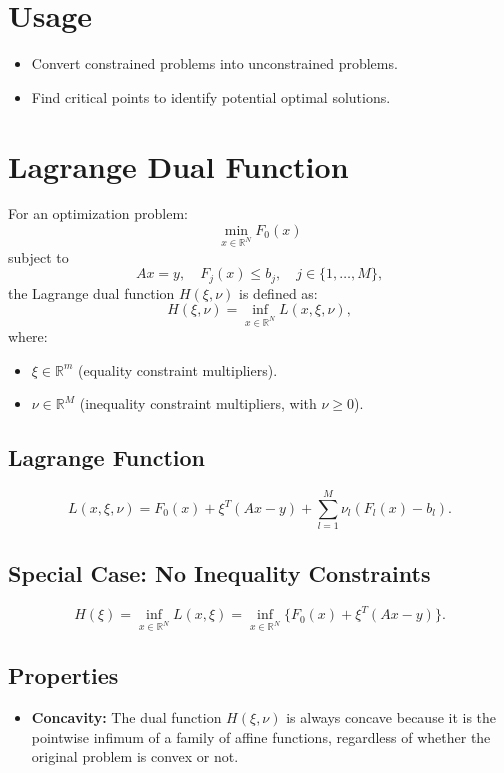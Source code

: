 \documentclass{article}
\begin{document}
\section*{Usage}
\begin{itemize}
    \item Convert constrained problems into unconstrained problems.
    \item Find critical points to identify potential optimal solutions.
\end{itemize}





\usepackage{amsthm}





\section*{Lagrange Dual Function}

For an optimization problem:
\[
\min_{x \in \mathbb{R}^N} F_0(x)
\]
subject to 
\[
Ax = y, \quad F_j(x) \leq b_j, \quad j \in \{1, \ldots, M\},
\]
the Lagrange dual function \(H(\xi, \nu)\) is defined as:
\[
H(\xi, \nu) = \inf_{x \in \mathbb{R}^N} L(x, \xi, \nu),
\]
where:
\begin{itemize}
    \item \(\xi \in \mathbb{R}^m\) (equality constraint multipliers).
    \item \(\nu \in \mathbb{R}^M\) (inequality constraint multipliers, with \(\nu \geq 0\)).
\end{itemize}

\subsection*{Lagrange Function}
\[
L(x, \xi, \nu) = F_0(x) + \xi^T(Ax - y) + \sum_{l=1}^{M} \nu_l (F_l(x) - b_l).
\]

\subsection*{Special Case: No Inequality Constraints}
\[
H(\xi) = \inf_{x \in \mathbb{R}^N} L(x, \xi) = \inf_{x \in \mathbb{R}^N} \{ F_0(x) + \xi^T(Ax - y) \} .
\]

\subsection*{Properties}
\begin{itemize}
    \item \textbf{Concavity:} The dual function \(H(\xi, \nu)\) is always concave because it is the pointwise infimum of a family of affine functions, regardless of whether the original problem is convex or not.
\end{itemize}
\end{document}

